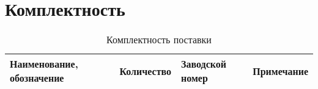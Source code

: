 \newpage

\section{Комплектность}

{

  \begin{table}[h]
    \caption{Комплектность поставки \genitivecasename}
    \centering
    \begin{tabularx}{\textwidth}{|m{7.2cm}|c|l|X|}
      \hline
      Наименование, обозначение&Количество&Заводской номер&Примечание\\\hline
      
    \end{tabularx}
    \label{tab:replicator_complect}
  \end{table}
}
